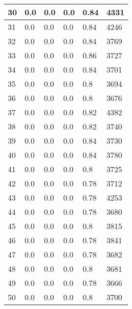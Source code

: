 \begin{longtable}{|l|l|l|l|l|l|}
30 & 0.0 & 0.0 & 0.0 & 0.84 & 4331 \\ \hline 
31 & 0.0 & 0.0 & 0.0 & 0.84 & 4246 \\ \hline 
32 & 0.0 & 0.0 & 0.0 & 0.84 & 3769 \\ \hline 
33 & 0.0 & 0.0 & 0.0 & 0.86 & 3727 \\ \hline 
34 & 0.0 & 0.0 & 0.0 & 0.84 & 3701 \\ \hline 
35 & 0.0 & 0.0 & 0.0 & 0.8 & 3694 \\ \hline 
36 & 0.0 & 0.0 & 0.0 & 0.8 & 3676 \\ \hline 
37 & 0.0 & 0.0 & 0.0 & 0.82 & 4382 \\ \hline 
38 & 0.0 & 0.0 & 0.0 & 0.82 & 3740 \\ \hline 
39 & 0.0 & 0.0 & 0.0 & 0.84 & 3730 \\ \hline 
40 & 0.0 & 0.0 & 0.0 & 0.84 & 3780 \\ \hline 
41 & 0.0 & 0.0 & 0.0 & 0.8 & 3725 \\ \hline 
42 & 0.0 & 0.0 & 0.0 & 0.78 & 3712 \\ \hline 
43 & 0.0 & 0.0 & 0.0 & 0.78 & 4253 \\ \hline 
44 & 0.0 & 0.0 & 0.0 & 0.78 & 3680 \\ \hline 
45 & 0.0 & 0.0 & 0.0 & 0.8 & 3815 \\ \hline 
46 & 0.0 & 0.0 & 0.0 & 0.78 & 3841 \\ \hline 
47 & 0.0 & 0.0 & 0.0 & 0.78 & 3682 \\ \hline 
48 & 0.0 & 0.0 & 0.0 & 0.8 & 3681 \\ \hline 
49 & 0.0 & 0.0 & 0.0 & 0.78 & 3666 \\ \hline 
50 & 0.0 & 0.0 & 0.0 & 0.8 & 3700 \\ \hline 
\end{longtable}